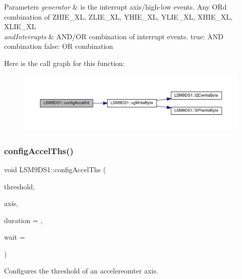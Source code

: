\begin{DoxyParams}{Parameters}
{\em generator} & is the interrupt axis/high-\/low events. Any OR\textquotesingle{}d combination of Z\+H\+I\+E\+\_\+\+XL, Z\+L\+I\+E\+\_\+\+XL, Y\+H\+I\+E\+\_\+\+XL, Y\+L\+I\+E\+\_\+\+XL, X\+H\+I\+E\+\_\+\+XL, X\+L\+I\+E\+\_\+\+XL \\
\hline
{\em and\+Interrupts} & A\+N\+D/\+OR combination of interrupt events. true\+: A\+ND combination false\+: OR combination \\
\hline
\end{DoxyParams}
Here is the call graph for this function\+:\nopagebreak
\begin{figure}[H]
\begin{center}
\leavevmode
\includegraphics[width=350pt]{classLSM9DS1_a1e8ebc6c1e3876d8936197dc93f76717_cgraph}
\end{center}
\end{figure}
\mbox{\label{classLSM9DS1_acebcf64ab4e6ea7ed7a23c09ef16afe9}} 
\subsubsection{\texorpdfstring{config\+Accel\+Ths()}{configAccelThs()}}
{\footnotesize\ttfamily void L\+S\+M9\+D\+S1\+::config\+Accel\+Ths (\begin{DoxyParamCaption}\item[{uint8\+\_\+t}]{threshold,  }\item[{lsm9ds1\+\_\+axis}]{axis,  }\item[{uint8\+\_\+t}]{duration = {},  }\item[{bool}]{wait = {} }\end{DoxyParamCaption})}



Configures the threshold of an accelereomter axis. 


